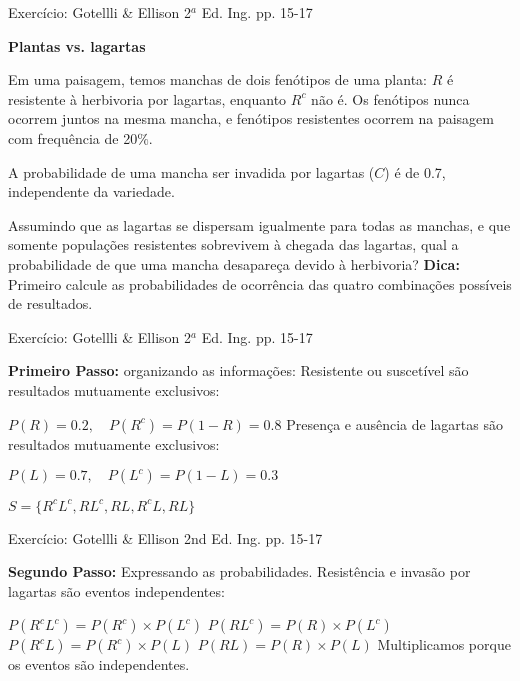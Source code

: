 \documentclass{beamer}\usepackage[]{graphicx}\usepackage[]{color}
\begin{document}
\begin{frame}{Exercício: Gotellli \& Ellison 2$^a$ Ed. Ing. pp. 15-17}

\textbf{Plantas vs. lagartas}

\begin{small}

Em uma paisagem, temos manchas de dois fenótipos de uma planta: $R$ é resistente à herbivoria por lagartas, enquanto $R^c$ não é. Os fenótipos nunca ocorrem juntos na mesma mancha, e fenótipos resistentes ocorrem na paisagem com frequência  de 20$\%$.

A probabilidade de uma mancha ser invadida por lagartas ($C$) é de 0.7, independente da variedade.
\vfill

Assumindo que as lagartas se dispersam igualmente para todas as manchas, e que somente populações resistentes sobrevivem à chegada das lagartas, qual a probabilidade de que uma mancha desapareça devido à herbivoria? 
\vfill
\alert{\textbf{Dica:}} Primeiro calcule as probabilidades de ocorrência das quatro combinações possíveis de resultados.

\end{small}

\end{frame}

\begin{frame}{Exercício: Gotellli \& Ellison 2$^a$ Ed. Ing. pp. 15-17}

\textbf{Primeiro Passo:} organizando as informações:
\vfill
Resistente ou suscetível são resultados mutuamente exclusivos:

$P(R) = 0.2, \quad P(R^c) = P(1 - R) = 0.8$
\vfill
Presença e ausência de lagartas são resultados mutuamente exclusivos:

$P(L) = 0.7, \quad P(L^c) = P(1 - L) = 0.3$

\vfill
$S = \{R^cL^c,RL^c,RL,R^cL,RL\}$

\end{frame}


\begin{frame}{Exercício: Gotellli \& Ellison 2nd Ed. Ing. pp. 15-17}

\textbf{Segundo Passo:} Expressando as probabilidades. Resistência e invasão por lagartas são eventos independentes:

\vfill
$P(R^cL^c) = P(R^c) \times P(L^c)$
\vfill
$P(RL^c) = P(R) \times P(L^c)$
\vfill
$P(R^cL) = P(R^c) \times P(L)$
\vfill
$P(RL) = P(R) \times P(L)$
\vfill
Multiplicamos porque os eventos são independentes.

\end{frame}
\end{document}

